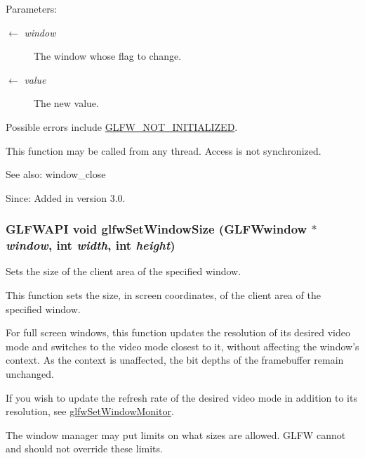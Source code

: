 \begin{Desc}
\item[Parameters:]
\begin{description}
\item[\mbox{$\leftarrow$} {\em window}]The window whose flag to change. \item[\mbox{$\leftarrow$} {\em value}]The new value.\end{description}
\end{Desc}
Possible errors include \hyperlink{group__errors_g2374ee02c177f12e1fa76ff3ed15e14a}{GLFW\_\-NOT\_\-INITIALIZED}.

This function may be called from any thread. Access is not synchronized.

\begin{Desc}
\item[See also:]window\_\-close\end{Desc}
\begin{Desc}
\item[Since:]Added in version 3.0. \end{Desc}
\hypertarget{group__window_ge54d1f4915ded15e267ddd3f41496cd2}{
\subsubsection[glfwSetWindowSize]{\setlength{\rightskip}{0pt plus 5cm}GLFWAPI void glfwSetWindowSize ({\bf GLFWwindow} $\ast$ {\em window}, \/  int {\em width}, \/  int {\em height})}}
\label{group__window_ge54d1f4915ded15e267ddd3f41496cd2}


Sets the size of the client area of the specified window. 

This function sets the size, in screen coordinates, of the client area of the specified window.

For full screen windows, this function updates the resolution of its desired video mode and switches to the video mode closest to it, without affecting the window's context. As the context is unaffected, the bit depths of the framebuffer remain unchanged.

If you wish to update the refresh rate of the desired video mode in addition to its resolution, see \hyperlink{group__window_g12fabf78575e59c00f822f323ae0b6ae}{glfwSetWindowMonitor}.

The window manager may put limits on what sizes are allowed. GLFW cannot and should not override these limits.

